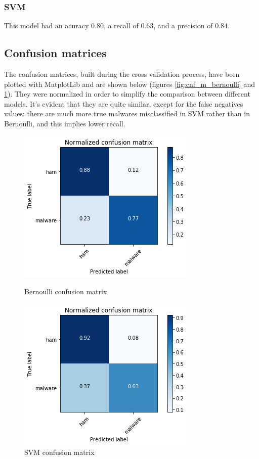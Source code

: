 \documentclass[12pt]{article}
\begin{document}
\subsubsection{SVM}
This model had an acuracy 0.80, a recall of 0.63, and a precision of 0.84.

\subsection{Confusion matrices}
The confusion matrices, built during the cross validation process, have been plotted with MatplotLib and are shown below (figures \ref{fig:cnf_m_bernoulli} and \ref{fig:cnf_m_svm}). They were normalized in order to simplify the comparison between different models. It's evident that they are quite similar, except for the false negatives values: there are much more true malwares misclassified in SVM rather than in Bernoulli, and this implies lower recall. 
\begin{figure}[!ht]
	\centering
	\begin{minipage}{.5\textwidth}
		\centering
		\includegraphics[width=.8\linewidth]{cnf_m_bernoulli.png}
		\caption{Bernoulli confusion matrix} %
		\label{fig:cnf_m_bernoulli}
	\end{minipage}%
	\begin{minipage}{.5\textwidth}
		\centering
		\includegraphics[width=.8\linewidth]{cnf_m_svm.png}
		\caption{SVM confusion matrix} %
		\label{fig:cnf_m_svm}
	\end{minipage}
\end{figure}
\end{document}

